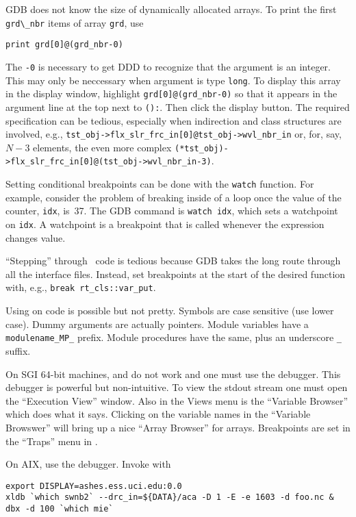 \documentclass[12pt,twoside]{article}
\begin{document}
GDB does not know the size of dynamically allocated arrays.
To print the first \verb'grd\_nbr' items of array \verb'grd', use
\begin{verbatim}
print grd[0]@(grd_nbr-0)
\end{verbatim}
The \verb'-0' is necessary to get DDD to recognize that the argument
is an integer.
This may only be neccessary when argument is type \verb'long'.
To display this array in the display window, highlight
\verb'grd[0]@(grd_nbr-0)' so that it appears in the argument line at
the top next to \verb'():'.
Then click the display button.
The required specification can be tedious, especially when indirection
and class structures are involved, e.g.,
\verb'tst_obj->flx_slr_frc_in[0]@tst_obj->wvl_nbr_in'
or, for, say, $N-3$ elements, the even more complex
\verb'(*tst_obj)->flx_slr_frc_in[0]@(tst_obj->wvl_nbr_in-3)'.

Setting conditional breakpoints can be done with the \verb'watch'
function.
For example, consider the problem of breaking inside of a loop
once the value of the counter, \verb'idx', is~37.
The GDB command is \verb'watch idx', which sets a watchpoint on
\verb'idx'.
A watchpoint is a breakpoint that is called whenever the expression
changes value.

``Stepping'' through \cxx\ code is tedious because GDB takes the long 
route through all the interface files.
Instead, set breakpoints at the start of the desired function
with, e.g., \verb'break rt_cls::var_put'.

Using  on  code is possible but not pretty.
Symbols are case sensitive (use lower case).
Dummy arguments are actually pointers.
Module variables have a \verb'modulename_MP_' prefix.
Module procedures have the same, plus an underscore \verb'_' suffix.

On SGI 64-bit machines,  and  do not work and one
must use the  debugger.
This debugger is powerful but non-intuitive. 
To view the stdout stream one must open the ``Execution View''
window. 
Also in the Views menu is the ``Variable Browser'' which does what it
says. 
Clicking on the variable names in the ``Variable Browswer'' will bring
up a nice ``Array Browser'' for arrays.
Breakpoints are set in the ``Traps'' menu in .

On AIX, use the  debugger.
Invoke with 
\begin{verbatim}
export DISPLAY=ashes.ess.uci.edu:0.0
xldb `which swnb2` --drc_in=${DATA}/aca -D 1 -E -e 1603 -d foo.nc &
dbx -d 100 `which mie`
\end{verbatim}
\end{document}
